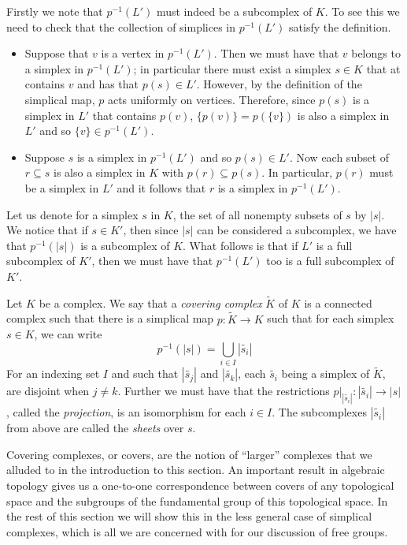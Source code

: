 Firstly we note that $p^{-1}(L')$ must indeed be a subcomplex of $K$. To see this we need to check that the collection of simplices in $p^{-1}(L')$ satisfy the definition.

\begin{itemize}
\item Suppose that $v$ is a vertex in $p^{-1}(L')$. Then we must have that $v$ belongs to a simplex in $p^{-1}(L')$; in particular there must exist a simplex $s \in K$ that at contains $v$ and has that $p(s) \in L'$. However, by the definition of the simplical map, $p$ acts uniformly on vertices. Therefore, since $p(s)$ is a simplex in $L'$ that contains $p(v)$, $\{ p(v) \} = p(\{ v \})$ is also a simplex in $L'$ and so $\{ v \} \in p^{-1}(L')$.
\item Suppose $s$ is a simplex in $p^{-1}(L')$ and so $p(s) \in L'$. Now each subset of $r \subseteq s$ is also a simplex in $K$ with $p(r) \subseteq p(s)$. In particular, $p(r)$ must be a simplex in $L'$ and it follows that $r$ is a simplex in $p^{-1}(L')$.
\end{itemize}

Let us denote for a simplex $s$ in $K$, the set of all nonempty subsets of $s$ by $|s|$. We notice that if $s \in K'$, then since $|s|$ can be considered a subcomplex, we have that $p^{-1}(|s|)$ is a subcomplex of $K$. What follows is that if $L'$ is a full subcomplex of $K'$, then we must have that $p^{-1}(L')$ too is a full subcomplex of $K'$.
\begin{definition}
  Let $K$ be a complex. We say that a \emph{covering complex} $\tilde{K}$  of $K$ is a connected complex such that there is a simplical map $p:\tilde{K} \rightarrow K$ such that for each simplex $s \in K$, we can write
  \begin{equation*}
    p^{-1}(|s|) = \bigcup_{i \in I} |\tilde{s_i}|
  \end{equation*}
  For an indexing set $I$ and such that $|\tilde{s_j}|$ and $|\tilde{s_k}|$, each $\tilde{s_i}$ being a simplex of $\tilde{K}$, are disjoint when $j \neq k$. Further we must have that the restrictions $p \vert_{|\tilde{s_i}|} : |\tilde{s_i}| \rightarrow |s|$, called the \emph{projection}, is an isomorphism for each $i \in I$. The subcomplexes $|\tilde{s_i}|$ from above are called the \emph{sheets} over $s$.
\end{definition}

Covering complexes, or covers, are the notion of ``larger'' complexes that we alluded to in the introduction to this section. An important result in algebraic topology gives us a one-to-one correspondence between covers of any topological space and the subgroups of the fundamental group of this topological space. In the rest of this section we will show this in the less general case of simplical complexes, which is all we are concerned with for our discussion of free groups.

